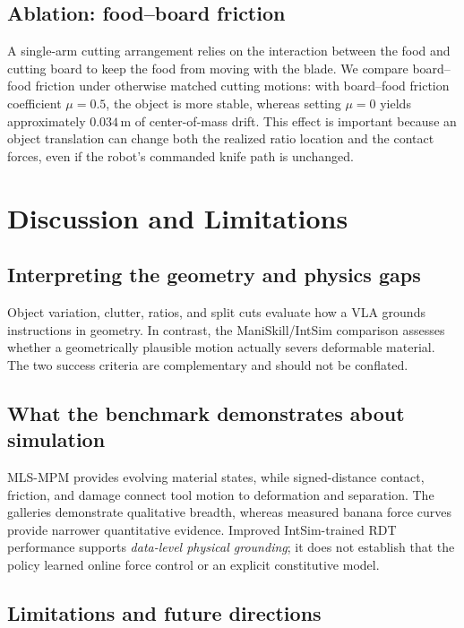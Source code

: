 \FloatBarrier

\subsection{Ablation: food--board friction}
\label{subsec:cut_ablation_friction}

A single-arm cutting arrangement relies on the interaction between the food and cutting board to keep the food from moving with the blade. We compare board--food friction under otherwise matched cutting motions: with board--food friction coefficient $\mu=0.5$, the object is more stable, whereas setting $\mu=0$ yields approximately $0.034$\,m of center-of-mass drift. This effect is important because an object translation can change both the realized ratio location and the contact forces, even if the robot's commanded knife path is unchanged.

\FloatBarrier

\section{Discussion and Limitations}
\label{sec:cut_discussion}

\subsection{Interpreting the geometry and physics gaps}
Object variation, clutter, ratios, and split cuts evaluate how a VLA grounds instructions in geometry. In contrast, the ManiSkill/IntSim comparison assesses whether a geometrically plausible motion actually severs deformable material. The two success criteria are complementary and should not be conflated.

\subsection{What the benchmark demonstrates about simulation}
MLS-MPM provides evolving material states, while signed-distance contact, friction, and damage connect tool motion to deformation and separation. The galleries demonstrate qualitative breadth, whereas measured banana force curves provide narrower quantitative evidence. Improved IntSim-trained RDT performance supports \emph{data-level physical grounding}; it does not establish that the policy learned online force control or an explicit constitutive model.

\subsection{Limitations and future directions}
